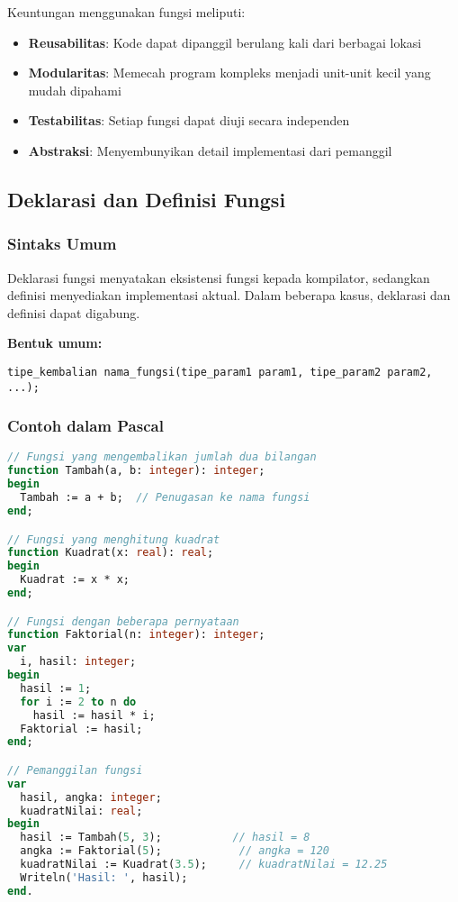 \documentclass[../main.tex]{subfiles}
\begin{document}
Keuntungan menggunakan fungsi meliputi:
\begin{itemize}
  \item \textbf{Reusabilitas}: Kode dapat dipanggil berulang kali dari berbagai lokasi
  \item \textbf{Modularitas}: Memecah program kompleks menjadi unit-unit kecil yang mudah dipahami
  \item \textbf{Testabilitas}: Setiap fungsi dapat diuji secara independen
  \item \textbf{Abstraksi}: Menyembunyikan detail implementasi dari pemanggil
\end{itemize}

\subsection{Deklarasi dan Definisi Fungsi}
\subsubsection{Sintaks Umum}
Deklarasi fungsi menyatakan eksistensi fungsi kepada kompilator, sedangkan definisi menyediakan implementasi aktual. Dalam beberapa kasus, deklarasi dan definisi dapat digabung.

\textbf{Bentuk umum:}
\begin{verbatim}
tipe_kembalian nama_fungsi(tipe_param1 param1, tipe_param2 param2, ...);
\end{verbatim}

\subsubsection{Contoh dalam Pascal}
\begin{lstlisting}[language=Pascal, caption={Deklarasi dan definisi fungsi (Pascal)}]
// Fungsi yang mengembalikan jumlah dua bilangan
function Tambah(a, b: integer): integer;
begin
  Tambah := a + b;  // Penugasan ke nama fungsi
end;

// Fungsi yang menghitung kuadrat
function Kuadrat(x: real): real;
begin
  Kuadrat := x * x;
end;

// Fungsi dengan beberapa pernyataan
function Faktorial(n: integer): integer;
var
  i, hasil: integer;
begin
  hasil := 1;
  for i := 2 to n do
    hasil := hasil * i;
  Faktorial := hasil;
end;

// Pemanggilan fungsi
var
  hasil, angka: integer;
  kuadratNilai: real;
begin
  hasil := Tambah(5, 3);           // hasil = 8
  angka := Faktorial(5);            // angka = 120
  kuadratNilai := Kuadrat(3.5);     // kuadratNilai = 12.25
  Writeln('Hasil: ', hasil);
end.
\end{lstlisting}
\end{document}
